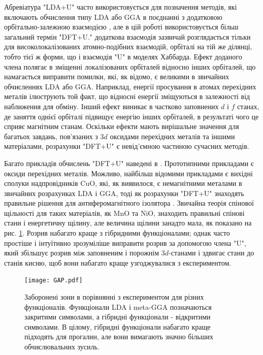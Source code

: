 Абревіатура "LDA+U" часто використовується для позначення методів, які включають обчислення типу LDA або GGA в поєднанні з додатковою орбітально-залежною взаємодією \cite{PhysRevB.44, Anisimov1997}, але в цій роботі використовується більш загальний термін "DFT+U." додаткова взаємодія зазвичай розглядається тільки для високолокалізованих атомно-подібних взаємодій, орбіталі на тій же ділянці, тобто тієї ж форми, що і взаємодія "U" в моделях Хаббарда. Ефект доданого члена полягає в зміщенні локалізованих орбіталей відносно інших орбіталей, що намагається виправити помилки, які, як відомо, є великими в звичайних обчисленнях LDA або GGA. Наприклад, енергії просування в атомах перехідних металів ілюструють той факт, що відносні енергії зміщуються в залежності від наближення для обміну. Інший ефект виникає в частково заповнених $d$ і $f$ станах, де заняття однієї орбіталі підвищує енергію інших орбіталей, в результаті чого це сприяє магнітним станам. Оскільки ефекти мають вирішальне значення для багатьох завдань, пов'язаних з $3d$ оксидами перехідних металів та іншими матеріалами, розрахунки "DFT+U" є невід'ємною частиною сучасних методів.

Багато прикладів обчислень "DFT+U" наведені в \cite{Anisimov1997}. Прототипними прикладами є оксиди перехідних металів. Можливо, найбільш відомими прикладами є вихідні сполуки надпровідників CuO, які, як виявилося, є немагнітними металами в звичайних розрахунках LDA і GGA, тоді як розрахунки "DFT+U" знаходять правильне рішення для антиферомагнітного ізолятора \cite{Anisimov1997}. Звичайна теорія спінової щільності для таких матеріалів, як MnO та NiO, знаходить правильні спінові стани і енергетичну щілину, але величина щілини занадто мала, як показано на рис. \ref{fig:GAP}. Розрив набагато краще з гібридними функціоналами; однак часто простіше і інтуїтивно зрозуміліше виправити розрив за допомогою члена "U", який збільшує розрив між заповненим і порожнім $3d$-станами і здвигає стани до станів кисню, щоб вони набагато краще узгоджувалися з експериментом.

\begin{figure}[H]
	\centering
	\texttt{[image: GAP.pdf]}
	\caption{Заборонені зони в порівнянні з експериментом для різних функціоналів. Функціонали LDA і meta-GGA позначаються закритими символами, а гібридні функціонали - відкритими символами. В цілому, гібридні функціонали набагато краще підходять для прогалин, але вони вимагають значно більших обчислювальних зусиль.}
	\label{fig:GAP}
\end{figure}

